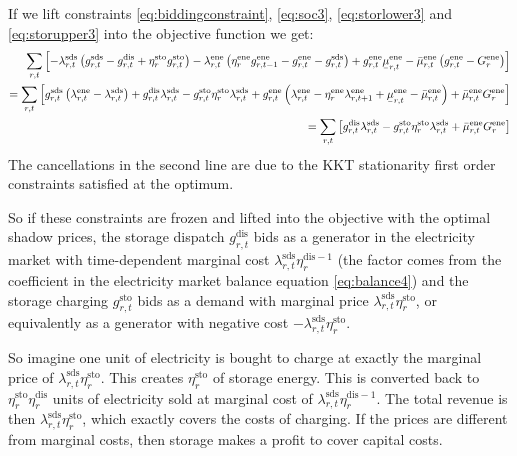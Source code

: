 \documentclass[final,3p]{elsarticle}
\begin{document}
If we lift constraints \eqref{eq:biddingconstraint}, \eqref{eq:soc3},
\eqref{eq:storlower3} and \eqref{eq:storupper3} into the objective function we
get:
\begin{align}
  \sum_{r,t} \left[ - \lambda^{\textrm{sds}}_{r,t} \left(  g^{\textrm{sds}}_{r,t} - g^{\textrm{dis}}_{r,t} + \eta^{\textrm{sto}}_r g^{\textrm{sto}}_{r,t}\right) - \lambda^{\textrm{ene}}_{r,t} \left(\eta^{\textrm{ene}}_r g^{\textrm{ene}}_{r,t-1} - g^{\textrm{ene}}_{r,t} - g^{\textrm{sds}}_{r,t}\right)  + g^{\textrm{ene}}_{r,t}\ubar{\mu}^{\textrm{ene}}_{r,t} -  \bar{\mu}^{\textrm{ene}}_{r,t}  \left(    g^{\textrm{ene}}_{r,t} - G^{\textrm{ene}}_r \right) \right]                                        \\
  =   \sum_{r,t} \left[  g^{\textrm{sds}}_{r,t} \left(\lambda^{\textrm{ene}}_{r,t} - \lambda^{\textrm{sds}}_{r,t} \right)  +g^{\textrm{dis}}_{r,t}\lambda^{\textrm{sds}}_{r,t}  -  g^{\textrm{sto}}_{r,t} \eta^{\textrm{sto}}_r \lambda^{\textrm{sds}}_{r,t} + g^{\textrm{ene}}_{r,t}\left(\lambda^{\textrm{ene}}_{r,t} -\eta^{\textrm{ene}}_r \lambda^{\textrm{ene}}_{r,t+1}  + \ubar{\mu}^{\textrm{ene}}_{r,t} -  \bar{\mu}^{\textrm{ene}}_{r,t} \right) + \bar{\mu}^{\textrm{ene}}_{r,t} G^{\textrm{ene}}_r \right] \\
  =   \sum_{r,t} \left[ g^{\textrm{dis}}_{r,t}\lambda^{\textrm{sds}}_{r,t}  -  g^{\textrm{sto}}_{r,t} \eta^{\textrm{sto}}_r \lambda^{\textrm{sds}}_{r,t} + \bar{\mu}^{\textrm{ene}}_{r,t} G^{\textrm{ene}}_r \right]
\end{align}
The cancellations in the second line are due to the KKT stationarity first order
constraints satisfied at the optimum.

So if these constraints are frozen and lifted into the objective with the
optimal shadow prices, the storage dispatch $g^{\textrm{dis}}_{r,t}$ bids as a
generator in the electricity market with time-dependent marginal cost
$\lambda^{\textrm{sds}}_{r,t}\eta^{\textrm{dis} -1}_r $ (the factor comes from
the coefficient in the electricity market balance equation \eqref{eq:balance4})
and the storage charging $g^{\textrm{sto}}_{r,t}$ bids as a demand with marginal
price $\lambda^{\textrm{sds}}_{r,t} \eta^{\textrm{sto}}_r$, or equivalently as a
generator with negative cost $-\lambda^{\textrm{sds}}_{r,t}
\eta^{\textrm{sto}}_r$.

So imagine one unit of electricity is bought to charge at exactly the marginal
price of $\lambda^{\textrm{sds}}_{r,t} \eta^{\textrm{sto}}_r$. This creates
$\eta^{\textrm{sto}}_r$ of storage energy. This is converted back to
$\eta^{\textrm{sto}}_r\eta^{\textrm{dis}}_r$ units of electricity sold at
marginal cost of $\lambda^{\textrm{sds}}_{r,t}\eta^{\textrm{dis}-1}_r $. The
total revenue is then $\lambda^{\textrm{sds}}_{r,t} \eta^{\textrm{sto}}_r$,
which exactly covers the costs of charging. If the prices are different from
marginal costs, then storage makes a profit to cover capital costs.
\end{document}
